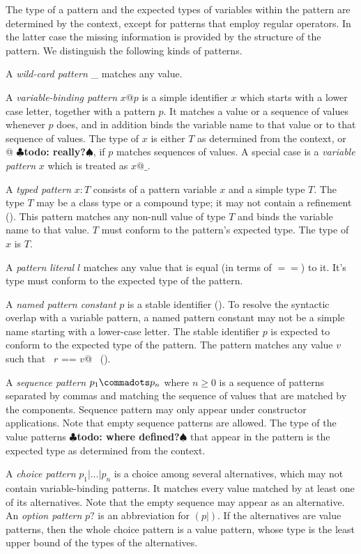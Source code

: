 \documentclass[a4paper,12pt,twoside,titlepage]{book}
\renewcommand{\todo}[1]{{$\clubsuit$\bf todo: #1$\spadesuit$}}
\begin{document}
The type of a pattern and the expected types of variables within the
pattern are determined by the context, except for patterns
that employ regular operators. In the latter case  the missing 
information is provided by the structure of the pattern. 
We distinguish the following kinds of patterns.

A {\em wild-card pattern} \_ matches any value. 

A {\em variable-binding pattern} $x @ p$ is a simple identifier $x$
which starts with a lower case letter, together with a pattern $p$. It
matches a value or a sequence of values whenever $p$ does, and in
addition binds the variable name to that value or to that sequence of
values. The type of $x$ is either $T$ as determined from the context, or
\lstinline@List[$T\,$]@ \todo{really?}, if $p$ matches sequences of values. A
special case is a {\em variable pattern} $x$ which is treated as $x @ \_$. 

A {\em typed pattern} $x: T$ consists of a pattern variable $x$ and a
simple type $T$. The type $T$ may be a class type or a compound type;
it may not contain a refinement ().  This
pattern matches any non-null value of type $T$ and binds the variable
name to that value.  $T$ must conform to the pattern's expected
type. The type of $x$ is $T$.

A {\em pattern literal} $l$ matches any value that is equal (in terms
of $==$) to it. It's type must conform to the expected type of the
pattern.

A {\em named pattern constant} $p$ is a stable identifier
(). To resolve the syntactic overlap with a
variable pattern, a named pattern constant may not be a simple name
starting with a lower-case letter. The stable identifier $p$ is
expected to conform to the expected type of the pattern. The pattern
matches any value $v$ such that ~\lstinline@$r$ == $v$@~ 
().

A {\em sequence pattern} $p_1 \commadots p_n$ where $n \geq 0$ is a
sequence of patterns separated by commas and matching the sequence of
values that are matched by the components. Sequence pattern may only
appear under constructor applications. Note that empty sequence
patterns are allowed. The type of the value patterns \todo{where defined?}
that appear in
the pattern is the expected type as determined from the context.

A {\em choice pattern} $p_1 | \ldots | p_n$ is a choice among several
alternatives, which may not contain variable-binding patterns. It
matches every value matched by at least one of its alternatives. Note
that the empty sequence may appear as an alternative.  An {\em option
pattern} $p?$ is an abbreviation for $(p| )$. If the alternatives
are value patterns, then the whole choice pattern is a value pattern,
whose type is the least upper bound of the types of the alternatives.
\end{document}
